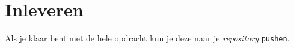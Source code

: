 \section{Inleveren}
Als je klaar bent met de hele opdracht kun je deze naar je \textit{repository} \texttt{pushen}.




